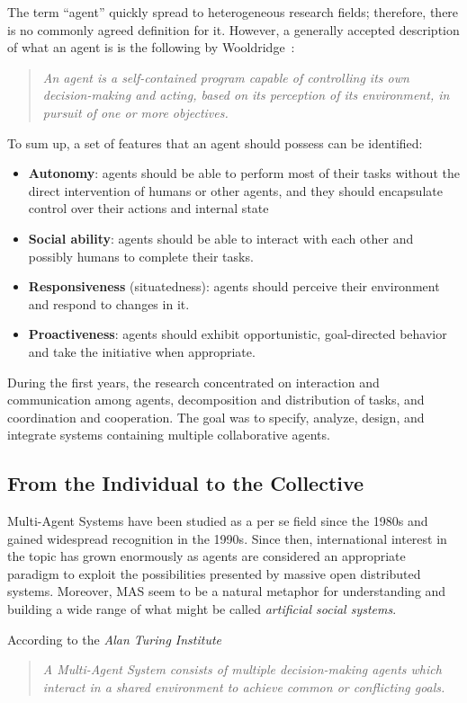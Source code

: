 The term ``agent'' quickly spread to heterogeneous research fields; therefore, there is no commonly agreed definition for it.
However, a generally accepted description of what an agent is is the following by Wooldridge~\cite{490039}:
\begin{quote}
    \textit{An agent is a self-contained program capable of controlling its own decision-making and acting, based on its perception of its environment, in pursuit of one or more objectives.}
\end{quote}
To sum up, a set of features that an agent should possess can be identified:
\begin{itemize}
    \item \textbf{Autonomy}: agents should be able to perform most of their tasks without the direct intervention of humans or other agents, and they should encapsulate control over their actions and internal state
    \item \textbf{Social ability}: agents should be able to interact with each other and possibly humans to complete their tasks.
    \item \textbf{Responsiveness} (situatedness): agents should perceive their environment and respond to changes in it.
    \item \textbf{Proactiveness}: agents should exhibit opportunistic, goal-directed behavior and take the initiative when appropriate.
\end{itemize}

During the first years, the research concentrated on interaction and communication among agents, decomposition and distribution of tasks, and coordination and cooperation.
The goal was to specify, analyze, design, and integrate systems containing multiple collaborative agents.

\subsection{From the Individual to the Collective}
Multi-Agent Systems have been studied as a per se field since the 1980s and gained widespread recognition in the 1990s.
Since then, international interest in the topic has grown enormously as agents are considered an appropriate paradigm to exploit the possibilities presented by massive open distributed systems.
Moreover, MAS seem to be a natural metaphor for understanding and building a wide range of what might be called \textit{artificial social systems}.~\cite{wooldridge2009introduction}

According to the \textit{Alan Turing Institute}~\cite{turing}
\begin{quote}
    \textit{A Multi-Agent System consists of multiple decision-making agents which interact in a shared environment to achieve common or conflicting goals.}
\end{quote}

